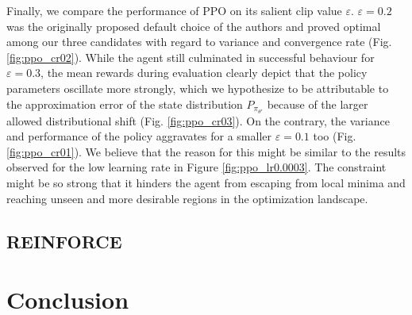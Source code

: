 \documentclass[a4paper, 11pt]{article}
\begin{document}
	Finally, we compare the performance of PPO on its salient clip value $\varepsilon$. $\varepsilon=0.2$ was the originally proposed default choice of the authors and proved optimal among our three candidates with regard to variance and convergence rate (Fig. \ref{fig:ppo_cr02}). While the agent still culminated in successful behaviour for $\varepsilon=0.3$, the mean rewards during evaluation clearly depict that the policy parameters oscillate more strongly, which we hypothesize to be attributable to the approximation error of the state distribution $P_{\pi_{\theta'}}$ because of the larger allowed distributional shift (Fig. \ref{fig:ppo_cr03}). On the contrary, the variance and performance of the policy aggravates for a smaller $\varepsilon=0.1$ too (Fig. \ref{fig:ppo_cr01}). We believe that the reason for this might be similar to the results observed for the low learning rate in Figure \ref{fig:ppo_lr0.0003}. The constraint might be so strong that it hinders the agent from escaping from local minima and reaching unseen and more desirable regions in the optimization landscape.
	\subsection{REINFORCE}
	\section{Conclusion}
	
\end{document}
